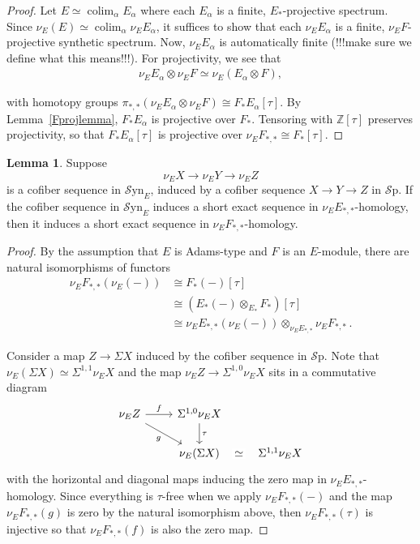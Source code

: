 \documentclass[10pt]{amsart}
\theoremstyle{definition}
\numberwithin{figure}{section}
\numberwithin{equation}{section}
\newtheorem{lem}[figure]{Lemma}
\theoremstyle{cited}
\newcommand{\colim}{\operatorname{colim}}
\newcommand{\Sp}{{\mathcal{S}\mathrm{p}}}
\newcommand{\Syn}{\mathcal{S}\mathrm{yn}}
\begin{document}
\begin{proof}
Let $E\simeq \colim _{\alpha} E_\alpha$ where each $E_\alpha$ is a finite, $E_*$-projective spectrum. Since $\nu_E(E)\simeq\colim_\alpha \nu_EE_\alpha$, it suffices to show that each $\nu_EE_\alpha$ is a finite, $\nu_EF$-projective synthetic spectrum. Now, $\nu_EE_\alpha$ is automatically finite (!!!make sure we define what this means!!!). For projectivity, we see that
$$
\begin{aligned}
\nu_EE_\alpha\otimes\nu_EF\simeq\nu_E(E_\alpha\otimes F),
\end{aligned}
$$

with homotopy groups $\pi_{*,*}(\nu_EE_\alpha\otimes\nu_EF)\cong F_*E_\alpha[\tau]$. By Lemma~\ref{Fprojlemma}, $F_*E_\alpha$ is projective over $F_*$. Tensoring with $\mathbb{Z}[\tau]$ preserves projectivity, so that
$F_*E_\alpha[\tau]$ is projective over $\nu_EF_{*,*}\cong F_*[\tau]$.  
\end{proof}

\begin{lem}
\label{nuEseslemma}
Suppose
$$
\nu_EX\to\nu_EY\to\nu_EZ
$$
is a cofiber sequence in $\Syn_E$, induced by a cofiber sequence $X\to Y\to Z$ in $\Sp$. If the cofiber sequence in $\Syn_E$ induces a short exact sequence in $\nu_EE_{*,*}$-homology, then it induces a short exact sequence in $\nu_EF_{*,*}$-homology. 
\end{lem}

\begin{proof}
By the assumption that $E$ is Adams-type and $F$ is an $E$-module, there are natural isomorphisms of functors
$$
\begin{aligned}
\nu_EF_{*,*}(\nu_E(-))&\cong F_*(-)[\tau] \\
&\cong (E_*(-)\otimes_{E_*}F_*)[\tau] \\
&\cong \nu_EE_{*,*}(\nu_{E}(-))\otimes_{\nu_EE_{*,*}}\nu_EF_{*,*}\, .
\end{aligned}
$$

Consider a map $Z\to\Sigma X$ induced by the cofiber sequence in $\Sp$. Note that $\nu_E(\Sigma X)\simeq\Sigma^{1,1}\nu_EX$ and the map $\nu_E Z\to\Sigma^{1,0}\nu_EX$ sits in a commutative diagram
\begin{equation*}
\begin{tikzcd}
\nu_EZ \ar[r, "f"] \ar[dr, "g"'] & \Sigma^{1,0}\nu_EX \ar[d,"\tau"] & \\
& \nu_E(\Sigma X) \ar[r, phantom, "{\simeq}" description] & \Sigma^{1,1}\nu_EX
\end{tikzcd}
\end{equation*}
with the horizontal and diagonal maps inducing the zero map in $\nu_EE_{*,*}$-homology. Since everything is $\tau$-free when we apply $\nu_EF_{*,*}(-)$ and the map $\nu_EF_{*,*}(g)$ is zero by the natural isomorphism above, then $\nu_EF_{*,*}(\tau)$ is injective so that $\nu_EF_{*,*}(f)$ is also the zero map.
\end{proof}
\end{document}
